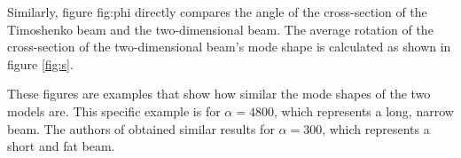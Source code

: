 \documentclass[../../main.tex]{subfiles}
\begin{document}
\begin{figure}[ht!]
\end{figure}
\FloatBarrier

Similarly, figure {fig:phi} directly compares the angle of the cross-section of the Timoshenko beam and the two-dimensional beam. The average rotation of the cross-section of the two-dimensional beam's mode shape is calculated as shown in figure \ref{fig:s}.

\FloatBarrier
\begin{figure}[ht!]
\end{figure}
\FloatBarrier

These figures are examples that show how similar the mode shapes of the two models are. This specific example is for $\alpha = 4800$, which represents a long, narrow beam. The authors of \cite{LVV09} obtained similar results for $\alpha=300$, which represents a short and fat beam.
\end{document}
